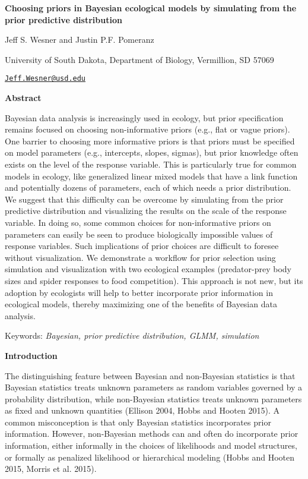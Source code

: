 \documentclass[
  12pt,
]{article}
\author{}
\date{\vspace{-2.5em}}
\begin{document}
\textbf{Choosing priors in Bayesian ecological models by simulating from
the prior predictive distribution}

Jeff S. Wesner and Justin P.F. Pomeranz

University of South Dakota, Department of Biology, Vermillion, SD 57069

\href{mailto:Jeff.Wesner@usd.edu}{\nolinkurl{Jeff.Wesner@usd.edu}}

\newpage

\textbf{Abstract}

Bayesian data analysis is increasingly used in ecology, but prior
specification remains focused on choosing non-informative priors (e.g.,
flat or vague priors). One barrier to choosing more informative priors
is that priors must be specified on model parameters (e.g., intercepts,
slopes, sigmas), but prior knowledge often exists on the level of the
response variable. This is particularly true for common models in
ecology, like generalized linear mixed models that have a link function
and potentially dozens of parameters, each of which needs a prior
distribution. We suggest that this difficulty can be overcome by
simulating from the prior predictive distribution and visualizing the
results on the scale of the response variable. In doing so, some common
choices for non-informative priors on parameters can easily be seen to
produce biologically impossible values of response variables. Such
implications of prior choices are difficult to foresee without
visualization. We demonstrate a workflow for prior selection using
simulation and visualization with two ecological examples (predator-prey
body sizes and spider responses to food competition). This approach is
not new, but its adoption by ecologists will help to better incorporate
prior information in ecological models, thereby maximizing one of the
benefits of Bayesian data analysis.

Keywords: \emph{Bayesian, prior predictive distribution, GLMM,
simulation}

\newpage

\textbf{Introduction}

The distinguishing feature between Bayesian and non-Bayesian statistics
is that Bayesian statistics treats unknown parameters as random
variables governed by a probability distribution, while non-Bayesian
statistics treats unknown parameters as fixed and unknown quantities
(Ellison 2004, Hobbs and Hooten 2015). A common misconception is that
only Bayesian statistics incorporates prior information. However,
non-Bayesian methods can and often do incorporate prior information,
either informally in the choices of likelihoods and model structures, or
formally as penalized likelihood or hierarchical modeling (Hobbs and
Hooten 2015, Morris et al. 2015).
\end{document}
